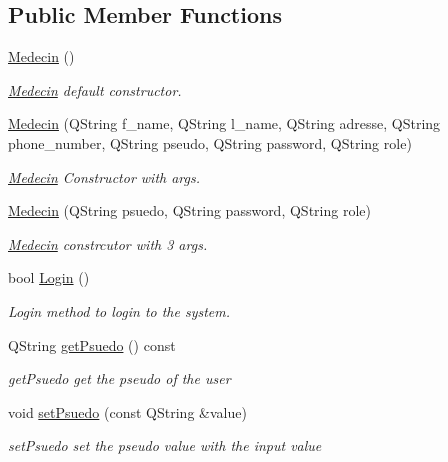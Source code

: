 \subsection*{Public Member Functions}
\begin{DoxyCompactItemize}
\item 
\mbox{\label{class_medecin_a37659992a29917f8aec4b88b4af415a5}} 
\mbox{\hyperlink{class_medecin_a37659992a29917f8aec4b88b4af415a5}{Medecin}} ()
\begin{DoxyCompactList}\small\item\em \mbox{\hyperlink{class_medecin}{Medecin}} default constructor. \end{DoxyCompactList}\item 
\mbox{\hyperlink{class_medecin_a5a919763f1f842a02aff5d158852e1e5}{Medecin}} (Q\+String f\+\_\+name, Q\+String l\+\_\+name, Q\+String adresse, Q\+String phone\+\_\+number, Q\+String pseudo, Q\+String password, Q\+String role)
\begin{DoxyCompactList}\small\item\em \mbox{\hyperlink{class_medecin}{Medecin}} Constructor with args. \end{DoxyCompactList}\item 
\mbox{\hyperlink{class_medecin_afd4e41fdf65e83d48797e01a1f7368d5}{Medecin}} (Q\+String psuedo, Q\+String password, Q\+String role)
\begin{DoxyCompactList}\small\item\em \mbox{\hyperlink{class_medecin}{Medecin}} constrcutor with 3 args. \end{DoxyCompactList}\item 
bool \mbox{\hyperlink{class_medecin_a01e4a472a632ecbbff5875f82887d3f1}{Login}} ()
\begin{DoxyCompactList}\small\item\em Login method to login to the system. \end{DoxyCompactList}\item 
Q\+String \mbox{\hyperlink{class_medecin_afbafe52dee9f67c274bf13cbe26ee517}{get\+Psuedo}} () const
\begin{DoxyCompactList}\small\item\em get\+Psuedo get the pseudo of the user \end{DoxyCompactList}\item 
void \mbox{\hyperlink{class_medecin_a2578faa446f961f05dc8578d1cf706d9}{set\+Psuedo}} (const Q\+String \&value)
\begin{DoxyCompactList}\small\item\em set\+Psuedo set the pseudo value with the input value \end{DoxyCompactList}\item 

\end{DoxyCompactItemize}
